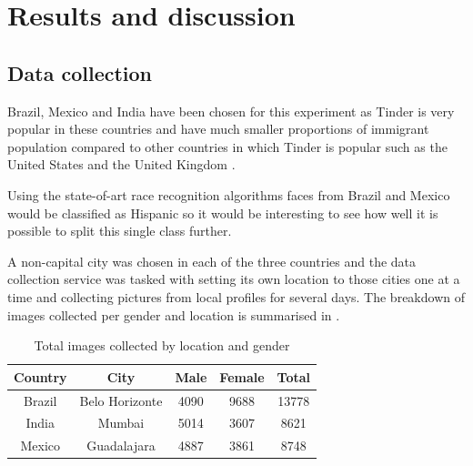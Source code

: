 \chapter{Results and discussion}
\section{Data collection}
\label{results:collection}
Brazil, Mexico and India have been chosen for this experiment as Tinder is very
popular in these countries \citep{tinderPopular} and have much smaller
proportions of immigrant population compared to other countries in which Tinder
is popular such as the United States and the United Kingdom
\citep{desa2013trends}.

Using the state-of-art race recognition algorithms faces from Brazil and Mexico
would be classified as Hispanic so it would be interesting to see how well it
is possible to split this single class further. 

A non-capital city was chosen in each of the three countries and the data
collection service was tasked with setting its own location to those cities one
at a time and collecting pictures from local profiles for several days. The
breakdown of images collected per gender and location is summarised in
.
\begin{table}[t]
    \begin{center}
        \begin{tabular}{ c c c c c }
            \toprule
            Country       & City              & Male   & Female & Total \\ 
            \toprule
            Brazil  & Belo Horizonte &  4090 & 9688 & 13778\\
            India   & Mumbai         &  5014 & 3607 & 8621 \\
            Mexico  & Guadalajara    &  4887 & 3861 & 8748\\
            \bottomrule
        \end{tabular}
    \end{center}
    \caption{Total images collected by location and gender}
    \label{table:results:dc:total_images}
\end{table}

